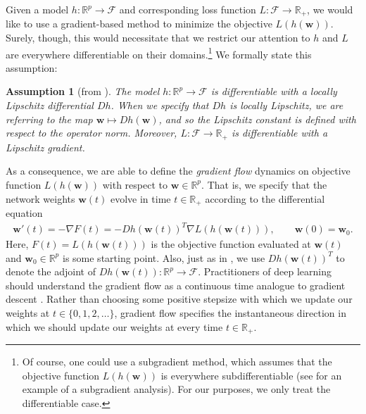 \documentclass{article}
\newtheorem*{assumption}{Assumption}
\begin{document}
Given a model $h: \mathbb{R}^p \rightarrow \mathcal{F}$ and corresponding loss function $L: \mathcal{F} \rightarrow \mathbb{R}_+$, we would like to use a gradient-based method to minimize the objective $L(h(\boldsymbol{w}))$. Surely, though, this would necessitate that we restrict our attention to $h$ and $L$ are everywhere differentiable on their domains.\footnote{Of course, one could use a subgradient method, which assumes that the objective function $L(h(\boldsymbol{w}))$ is everywhere subdifferentiable (see \cite{lyu2019gradient} for an example of a subgradient analysis). For our purposes, we only treat the differentiable case.} We formally state this assumption:
\begin{assumption}[from \cite{chizat2019lazy}]\label{assumption1}
The model $h: \mathbb{R}^p \rightarrow \mathcal{F}$ is differentiable with a locally Lipschitz differential $Dh$. When we specify that $Dh$ is locally Lipschitz, we are referring to the map $\boldsymbol{w} \mapsto Dh(\boldsymbol{w})$, and so the Lipschitz constant is defined with respect to the operator norm. Moreover, $L: \mathcal{F} \rightarrow \mathbb{R}_+$ is differentiable with a Lipschitz gradient.
\end{assumption}
As a consequence, we are able to define the \textit{gradient flow} dynamics on objective function $L(h(\boldsymbol{w}))$ with respect to $\boldsymbol{w} \in \mathbb{R}^p$. That is, we specify that the network weights $\boldsymbol{w}(t)$ evolve in time $t \in \mathbb{R}_+$ according to the differential equation
\begin{align*}
    \boldsymbol{w}'(t) = -\nabla F(t) = - Dh(\boldsymbol{w}(t))^T \nabla L(h(\boldsymbol{w}(t))), \qquad \boldsymbol{w}(0) = \boldsymbol{w}_0.
\end{align*}
Here, $F(t) = L(h(\boldsymbol{w}(t)))$ is the objective function evaluated at $\boldsymbol{w}(t)$ and $\boldsymbol{w}_0 \in \mathbb{R}^p$ is some starting point. Also, just as in \cite{chizat2019lazy}, we use $Dh(\boldsymbol{w}(t))^T$ to denote the adjoint of $Dh(\boldsymbol{w}(t)): \mathbb{R}^p \rightarrow \mathcal{F}$. Practitioners of deep learning should understand the gradient flow as a continuous time analogue to gradient descent \cite{wibisono2016}. Rather than choosing some positive stepsize with which we update our weights at $t \in \{0, 1, 2, \ldots \}$, gradient flow specifies the instantaneous direction in which we should update our weights at every time $t \in \mathbb{R}_+$.
\end{document}
